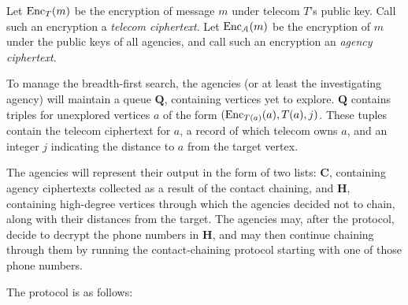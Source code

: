 Let $\operatorname{Enc}_T(m)$ be the encryption of message $m$ under telecom $T$'s public key. Call such an encryption a \emph{telecom ciphertext}. Let $\operatorname{Enc}_\mathcal{A}(m)$ be the encryption of $m$ under the public keys of all agencies, and call such an encryption an \emph{agency ciphertext}.

To manage the breadth-first search, the agencies (or at least the investigating agency) will maintain a queue $\mathbf{Q}$, containing vertices yet to explore. $\mathbf{Q}$ contains triples for unexplored vertices $a$ of the form $(\operatorname{Enc}_{T(a)}(a), T(a), j)$. These tuples contain the telecom ciphertext for $a$, a record of which telecom owns $a$, and an integer $j$ indicating the distance to $a$ from the target vertex.

The agencies will represent their output in the form of two lists: $\mathbf{C}$, containing agency ciphertexts collected as a result of the contact chaining, and $\mathbf{H}$, containing high-degree vertices through which the agencies decided not to chain, along with their distances from the target. The agencies may, after the protocol, decide to decrypt the phone numbers in $\mathbf{H}$, and may then continue chaining through them by running the contact-chaining protocol starting with one of those phone numbers.

The protocol is as follows:

